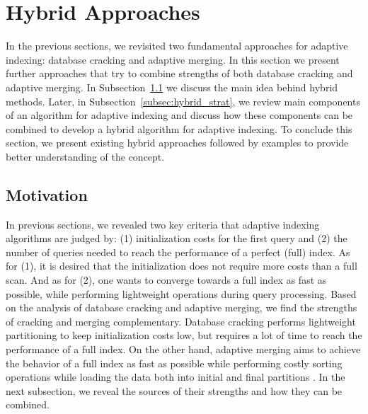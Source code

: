\documentclass[10pt, conference, compsocconf]{IEEEtran}
\begin{document}
\section{Hybrid Approaches}
\label{sec:hybrid}
In the previous sections, we revisited two fundamental approaches for adaptive indexing: database cracking and adaptive merging. In this section we present further approaches that try to combine strengths of both database cracking and adaptive merging. In Subsection~\ref{subsec:hybrid_motiv} we discuss the main idea behind hybrid methods. Later, in Subsection~\ref{subsec:hybrid_strat}, we review main components of an algorithm for adaptive indexing and discuss how these components can be combined to develop a hybrid algorithm for adaptive indexing. To conclude this section, we present existing hybrid approaches followed by examples to provide better understanding of the concept.

\subsection{Motivation}
\label{subsec:hybrid_motiv}
In previous sections, we revealed two key criteria that adaptive indexing algorithms are judged by: (1) initialization costs for the first query and (2) the number of queries needed to reach the performance of a perfect (full) index. As for (1), it is desired that the initialization does not require more costs than a full scan. And as for (2), one wants to converge towards a full index as fast as possible, while performing lightweight operations during query processing. Based on the analysis of database cracking and adaptive merging, we find the strengths of cracking and merging complementary. Database cracking performs lightweight partitioning to keep initialization costs low, but requires a lot of time to reach the performance of a full index. On the other hand, adaptive merging aims to achieve the behavior of a full index as fast as possible while performing costly sorting operations while loading the data both into initial and final partitions \cite{hybrid}. In the next subsection, we reveal the sources of their strengths and how they can be combined.
\end{document}
